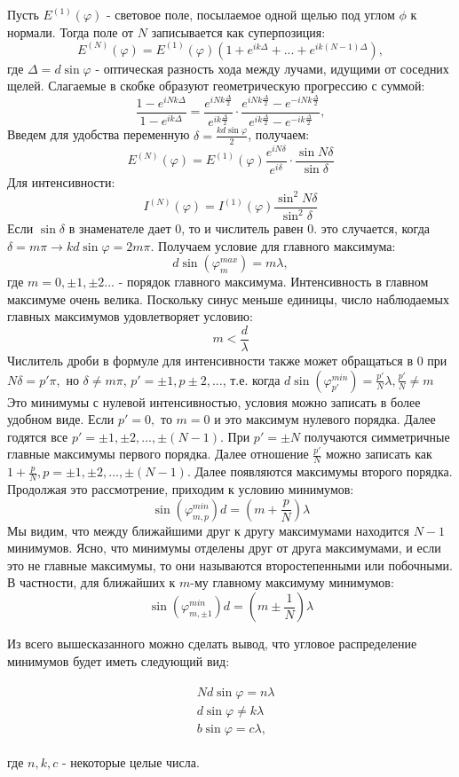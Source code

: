 \documentclass[__main__.tex]{subfiles}
\begin{document}
Пусть $E^{(1)} (\varphi)$ - световое поле, посылаемое одной щелью под углом $\phi$ к нормали. Тогда поле от $N$ записывается как суперпозиция:
$$E^{(N)}(\varphi) = E^{(1)}(\varphi)(1 + e^{ik\Delta} + ... + e^{ik(N-1)\Delta}),$$
где $\Delta = d\sin \varphi$ - оптическая разность хода между лучами, идущими от соседних щелей. Слагаемые в скобке образуют геометрическую прогрессию с суммой:
$$\frac{1-e^{iNk\Delta}}{1-e^{ik\Delta}} = \frac{e^{iNk\frac{\Delta}{2}}}{e^{ik\frac{\Delta}{2}}}\cdot \frac{e^{iNk\frac{\Delta}{2}} - e^{-iNk\frac{\Delta}{2}}}{e^{ik\frac{\Delta}{2}} - e^{-ik\frac{\Delta}{2}}},$$
Введем для удобства переменную $\delta = \frac{kd\sin\varphi}{2}$, получаем:
$$E^{(N)}(\varphi) = E^{(1)}(\varphi)\frac{e^{iN\delta}}{e^{i\delta}}\cdot \frac{\sin N\delta}{\sin\delta}$$
Для интенсивности:
$$I^{(N)}(\varphi) = I^{(1)}(\varphi)\frac{\sin^2 N\delta}{\sin^2\delta}$$
Если $\sin \delta$ в знаменателе дает 0, то и числитель равен 0. это случается, когда $\delta = m\pi \rightarrow kd\sin\varphi = 2m\pi$. Получаем условие для главного максимума:
$$d\sin(\varphi^{max}_m) = m\lambda,$$
где $m = 0, \pm 1, \pm 2...$ - порядок главного максимума. Интенсивность в главном максимуме очень велика. Поскольку синус меньше единицы, число наблюдаемых главных максимумов удовлетворяет условию:
$$m < \frac{d}{\lambda}$$
Числитель дроби в формуле для интенсивности также может обращаться в 0 при $N\delta = p'\pi, $ но $\delta \neq m\pi$, $p' = \pm 1, p\pm 2, ...$, т.е. когда $d\sin(\varphi ^{min}_{p'}) = \frac{p'}{N}\lambda, \frac{p'}{N} \neq m$
Это минимумы с нулевой интенсивностью, условия можно записать в более удобном виде. Если $p' = 0, $ то $m = 0$ и это максимум нулевого порядка. Далее годятся все $p' = \pm1, \pm2, ... , \pm(N-1). $ При $p' = \pm N$ получаются симметричные главные максимумы первого порядка. Далее отношение $\frac{p'}{N}$ можно записать как $1 + \frac{p}{N}, p =  \pm1, \pm2, ... , \pm(N-1)$. Далее появляются максимумы второго порядка. Продолжая это рассмотрение, приходим к условию минимумов:
$$
    \sin(\varphi^{min}_{m, p})d=(m + \frac{p}{N})\lambda
$$
Мы видим, что между ближайшими друг к другу максимумами находится $N - 1$ минимумов. Ясно, что минимумы отделены друг от друга максимумами, и если это не главные максимумы, то они называются второстепенными или побочными. В частности, для ближайших к $m$-му главному максимуму минимумов:
$$
    \sin(\varphi^{min}_{m, \pm1})d = (m \pm \frac{1}{N})\lambda
$$

Из всего вышесказанного можно сделать вывод, что угловое распределение минимумов будет иметь следующий вид:

\begin{gather*}
    \begin{split}
        &Nd\sin\varphi = n\lambda\\
        &d\sin\varphi \neq k\lambda\\
        &b\sin\varphi = c \lambda,
    \end{split}
\end{gather*}

где $n, k, c$ - некоторые целые числа.
\end{document}

